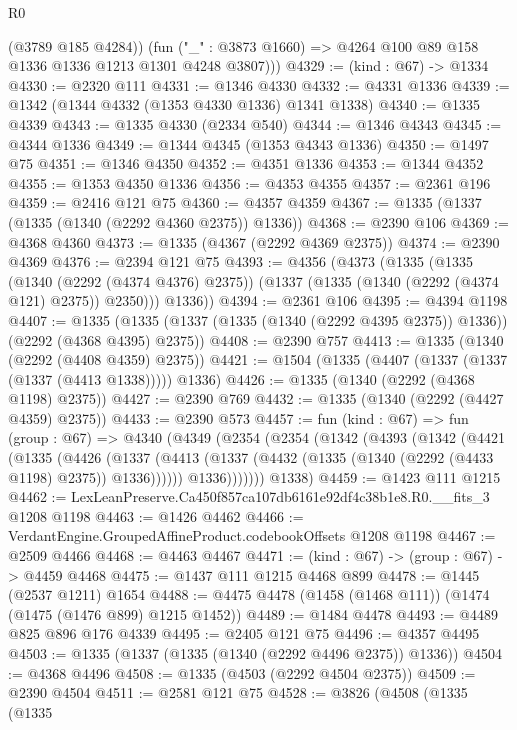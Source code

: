 \begin{lexlean}{R0}
\begin{coremodule}
          (@3789 @185 @4284))
        (fun ("_" : @3873 @1660) => @4264 @100 @89 @158 @1336 @1336 @1213 @1301 @4248 @3807)))
@4329 := (kind : @67) -> @1334
@4330 := @2320 @111
@4331 := @1346 @4330
@4332 := @4331 @1336
@4339 := @1342 (@1344 @4332 (@1353 @4330 @1336) @1341 @1338)
@4340 := @1335 @4339
@4343 := @1335 @4330 (@2334 @540)
@4344 := @1346 @4343
@4345 := @4344 @1336
@4349 := @1344 @4345 (@1353 @4343 @1336)
@4350 := @1497 @75
@4351 := @1346 @4350
@4352 := @4351 @1336
@4353 := @1344 @4352
@4355 := @1353 @4350 @1336
@4356 := @4353 @4355
@4357 := @2361 @196
@4359 := @2416 @121 @75
@4360 := @4357 @4359
@4367 := @1335 (@1337 (@1335 (@1340 (@2292 @4360 @2375)) @1336))
@4368 := @2390 @106
@4369 := @4368 @4360
@4373 := @1335 (@4367 (@2292 @4369 @2375))
@4374 := @2390 @4369
@4376 := @2394 @121 @75
@4393 := @4356
    (@4373
      (@1335
        (@1335
          (@1340 (@2292 (@4374 @4376) @2375))
          (@1337 (@1335 (@1340 (@2292 (@4374 @121) @2375)) @2350)))
        @1336))
@4394 := @2361 @106
@4395 := @4394 @1198
@4407 := @1335 (@1335 (@1337 (@1335 (@1340 (@2292 @4395 @2375)) @1336)) (@2292 (@4368 @4395) @2375))
@4408 := @2390 @757
@4413 := @1335 (@1340 (@2292 (@4408 @4359) @2375))
@4421 := @1504 (@1335 (@4407 (@1337 (@1337 (@1337 (@4413 @1338))))) @1336)
@4426 := @1335 (@1340 (@2292 (@4368 @1198) @2375))
@4427 := @2390 @769
@4432 := @1335 (@1340 (@2292 (@4427 @4359) @2375))
@4433 := @2390 @573
@4457 := fun (kind : @67) =>
  fun (group : @67) =>
  @4340
    (@4349
      (@2354
        (@2354
          (@1342
            (@4393
              (@1342
                (@4421
                  (@1335
                    (@4426
                      (@1337
                        (@4413 (@1337 (@4432 (@1335 (@1340 (@2292 (@4433 @1198) @2375)) @1336))))))
                    @1336)))))))
      @1338)
@4459 := @1423 @111 @1215
@4462 := LexLeanPreserve.Ca450f857ca107db6161e92df4c38b1e8.R0.__fits_3 @1208 @1198
@4463 := @1426 @4462
@4466 := VerdantEngine.GroupedAffineProduct.codebookOffsets @1208 @1198
@4467 := @2509 @4466
@4468 := @4463 @4467
@4471 := (kind : @67) -> (group : @67) -> @4459 @4468
@4475 := @1437 @111 @1215 @4468 @899
@4478 := @1445 (@2537 @1211) @1654
@4488 := @4475 @4478 (@1458 (@1468 @111)) (@1474 (@1475 (@1476 @899) @1215 @1452))
@4489 := @1484 @4478
@4493 := @4489 @825 @896 @176 @4339
@4495 := @2405 @121 @75
@4496 := @4357 @4495
@4503 := @1335 (@1337 (@1335 (@1340 (@2292 @4496 @2375)) @1336))
@4504 := @4368 @4496
@4508 := @1335 (@4503 (@2292 @4504 @2375))
@4509 := @2390 @4504
@4511 := @2581 @121 @75
@4528 := @3826
    (@4508
      (@1335
        (@1335

\end{coremodule}
\end{lexlean}
